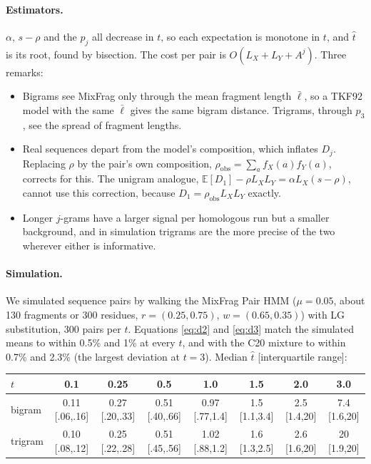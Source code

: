 \documentclass[11pt]{article}
\newcommand{\E}{\mathbb E}
\begin{document}
\paragraph{Estimators.} $\alpha$, $s-\rho$ and the $p_j$ all decrease in $t$,
so each expectation is monotone in $t$, and $\hat t$ is its root, found by
bisection. The cost per pair is $O(L_X+L_Y+A^j)$. Three remarks:
\begin{itemize}
\item Bigrams see MixFrag only through the mean fragment length $\bar\ell$,
  so a TKF92 model with the same $\bar\ell$ gives the same bigram distance.
  Trigrams, through $p_3$, see the spread of fragment lengths.
\item Real sequences depart from the model's composition, which inflates
  $D_j$. Replacing $\rho$ by the pair's own composition,
  $\rho_{\mathrm{obs}}=\sum_af_X(a)f_Y(a)$, corrects for this. The unigram
  analogue, $\E[D_1]-\rho L_XL_Y=\alpha L_X(s-\rho)$, cannot use this
  correction, because $D_1=\rho_{\mathrm{obs}}L_XL_Y$ exactly.
\item Longer $j$-grams have a larger signal per homologous run but a smaller
  background, and in simulation trigrams are the more precise of the two
  wherever either is informative.
\end{itemize}

\paragraph{Simulation.} We simulated sequence pairs by walking the MixFrag
Pair HMM ($\mu=0.05$, about 130 fragments or 300 residues,
$r=(0.25,0.75)$, $w=(0.65,0.35)$) with LG substitution, 300 pairs per $t$.
Equations \eqref{eq:d2} and \eqref{eq:d3} match the simulated means to within
0.5\% and 1\% at every $t$, and with the C20 mixture to within 0.7\% and
2.3\% (the largest deviation at $t=3$). Median $\hat t$
[interquartile range]:

\begin{center}
\footnotesize
\setlength{\tabcolsep}{3pt}
\begin{tabular}{lccccccc}
\toprule
$t$ & 0.1 & 0.25 & 0.5 & 1.0 & 1.5 & 2.0 & 3.0\\
\midrule
bigram  & 0.11 [.06,.16] & 0.27 [.20,.33] & 0.51 [.40,.66] & 0.97 [.77,1.4]
        & 1.5 [1.1,3.4] & 2.5 [1.4,20] & 7.4 [1.6,20]\\
trigram & 0.10 [.08,.12] & 0.25 [.22,.28] & 0.51 [.45,.56] & 1.02 [.88,1.2]
        & 1.6 [1.3,2.5] & 2.6 [1.6,20] & 20 [1.9,20]\\
\bottomrule
\end{tabular}
\end{center}
\end{document}
